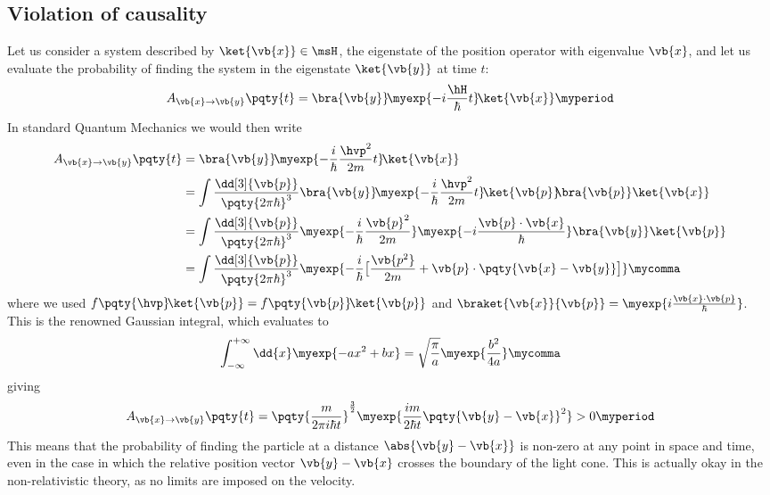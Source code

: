         \subsection{Violation of causality}\label{ss:violation-of-causality}
            Let us consider a system described by $\ket{\vb{x}} \in \msH$, the eigenstate of the position operator with eigenvalue $\vb{x}$, and let us evaluate the probability of finding the system in the eigenstate $\ket{\vb{y}}$ at time $t$:
            \begin{equation*}
                A_{\vb{x} \to \vb{y}}\pqty{t} = \bra{\vb{y}}\! \myexp{-i \frac{\hH}{\hbar} t} \!\ket{\vb{x}}
                \myperiod
            \end{equation*}
            In standard Quantum Mechanics we would then write
            \begin{align*}
                A_{\vb{x} \to \vb{y}}\pqty{t} 
                &= \bra{\vb{y}}\! \myexp{-\frac{i}{\hbar} \frac{\hvp^2}{2m} t} \!\ket{\vb{x}} \\
                &= \int\nolimits \frac{\dd[3]{\vb{p}}}{\pqty{2 \pi \hbar}^3} \bra{\vb{y}}\! \myexp{-\frac{i}{\hbar} \frac{\hvp^2}{2m} t} \!\ket{\vb{p}}\! \!\bra{\vb{p}}\ket{\vb{x}} \\
                &= \int\nolimits \frac{\dd[3]{\vb{p}}}{\pqty{2 \pi \hbar}^3} \myexp{-\frac{i}{\hbar}\frac{\vb{p}^2}{2m}} \myexp{-i\frac{\vb{p} \cdot \vb{x}}{\hbar}} \bra{\vb{y}}\ket{\vb{p}} \\
                &= \int\nolimits \frac{\dd[3]{\vb{p}}}{\pqty{2 \pi \hbar}^3} \myexp{-\frac{i}{\hbar} \bigl[\frac{\vb{p^2}}{2m} + \vb{p} \cdot \pqty{\vb{x} - \vb{y}}\bigr]}
                \mycomma
            \end{align*}
            where we used $f\pqty{\hvp} \!\ket{\vb{p}} = f\pqty{\vb{p}} \!\ket{\vb{p}}$ and $\braket{\vb{x}}{\vb{p}} = \myexp{i \frac{\vb{x} \cdot \vb{p}}{\hbar}}$. This is the renowned Gaussian integral, which evaluates to
            \begin{equation}
                \int_{-\infty}^{+\infty} \dd{x} \myexp{-a x^2 + b x} = \sqrt{\frac{\pi}{a}} \myexp{\frac{b^2}{4a}}
                \mycomma
            \end{equation}
            giving
            \begin{equation*}
                A_{\vb{x} \to \vb{y}}\pqty{t}
                = \pqty{\frac{m}{2 \pi i \hbar t}}^{\frac{3}{2}} \myexp{\frac{i m}{2 \hbar t} \pqty{\vb{y} - \vb{x}}^2}
                > 0
                \myperiod
            \end{equation*}
            This means that the probability of finding the particle at a distance $\abs{\vb{y} - \vb{x}}$ is non-zero at any point in space and time, even in the case in which the relative position vector $\vb{y} - \vb{x}$ crosses the boundary of the light cone. This is actually okay in the non-relativistic theory, as no limits are imposed on the velocity.

